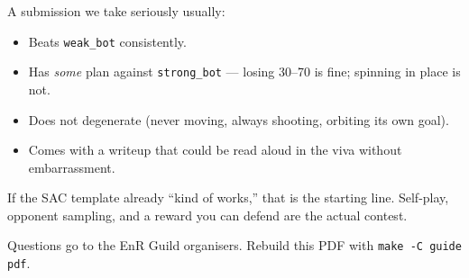 \documentclass[11pt,a4paper]{article}
\begin{document}
A submission we take seriously usually:

\begin{itemize}
  \item Beats \texttt{weak\_bot} consistently.
  \item Has \emph{some} plan against \texttt{strong\_bot} --- losing 30--70 is fine; spinning in place is not.
  \item Does not degenerate (never moving, always shooting, orbiting its own goal).
  \item Comes with a writeup that could be read aloud in the viva without embarrassment.
\end{itemize}

If the SAC template already ``kind of works,'' that is the starting line. Self-play, opponent sampling, and a reward you can defend are the actual contest.

\vspace{1.1em}
{\sffamily\small\color{slate}Questions go to the EnR Guild organisers. Rebuild this PDF with \texttt{make -C guide pdf}.\par}
\end{document}
